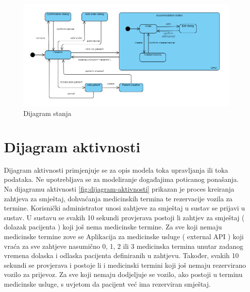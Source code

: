 			
			\begin{figure}[H]
				\includegraphics[scale=0.8]{slike/arhitektura_state_machine_diagram.png} %
				\centering
				\caption{Dijagram stanja}
				\label{fig:arhitektura_state_machine_diagram}
			\end{figure}
			
			
			\eject 
		
		\section{Dijagram aktivnosti}
			
			Dijagram aktivnosti primjenjuje se za opis modela toka upravljanja ili toka podataka. Ne upotrebljava se za modeliranje događajima poticanog ponašanja. 
			Na dijagramu aktivnosti \ref{fig:dijagram-aktivnosti} prikazan je proces kreiranja zahtjeva za smještaj, dohvaćanja medicinskih termina te rezervacije vozila za termine. Korisnički administrator unosi zahtjeve za smještaj u sustav se prijavi u sustav. U sustavu se svakih 10 sekundi provjerava postoji li zahtjev za smještaj ( dolazak pacijenta ) koji još nema medicinske termine. Za sve koji nemaju medicinske termine zove se Aplikacija za medicinske usluge ( external API ) koji vraća za sve zahtjeve nasumično 0, 1, 2 ili 3 medicinska termina unutar zadanog vremena dolaska i odlaska pacijenta definiranih u zahtjevu. Također, svakih 10 sekundi se provjerava i postoje li i medicinski termini koji još nemaju rezervirano vozilo za prijevoz. Za sve koji nemaju dodjeljuje se vozilo, ako postoji u terminu medicinske usluge, s uvjetom da pacijent već ima rezerviran smještaj.
			
